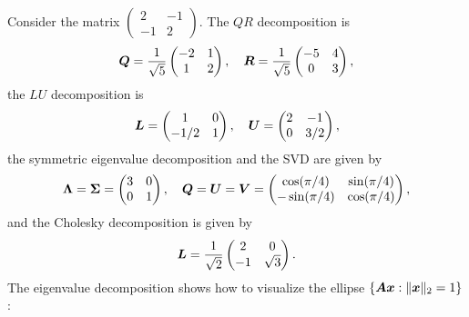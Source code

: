 \begin{example}
Consider the matrix $
  \begin{pmatrix}
    2 & -1\\ -1 & 2
  \end{pmatrix}$.
The $QR$ decomposition is
\begin{equation*}
\bm{Q} = \frac{1}{\sqrt{5}}\begin{pmatrix}
-2 & 1\\
1 & 2
\end{pmatrix}, \quad
\bm{R} = \frac{1}{\sqrt{5}}\begin{pmatrix}
-5 & 4\\
0 & 3
\end{pmatrix},
\end{equation*}
the $LU$ decomposition is
\begin{equation*}
\bm{L} = \begin{pmatrix}
1 & 0\\
-1/2 & 1
\end{pmatrix}, \quad
\bm{U} = \begin{pmatrix}
  2 & -1\\
  0 & 3/2
\end{pmatrix},
\end{equation*}
the symmetric eigenvalue decomposition and the SVD are given by
\begin{equation*}
 \bm{\Lambda} = \bm{\Sigma} = \begin{pmatrix}
 3 & 0\\
 0 & 1
 \end{pmatrix}, \quad
 \bm{Q} = \bm{U} = \bm{V} = \begin{pmatrix}
 \cos(\pi/4) & \sin(\pi/4)\\
 -\sin(\pi/4) & \cos(\pi/4)
 \end{pmatrix},
\end{equation*}
and the Cholesky decomposition is given by
\begin{equation*}
\bm{L} = \frac{1}{\sqrt{2}}\begin{pmatrix}
2 & 0\\
-1 & \sqrt{3}
\end{pmatrix}.
\end{equation*}
The eigenvalue decomposition shows how to visualize the ellipse $\{\bm{A}\bm{x} \mathrel{\mathop{:}} \Vert {\bm{x}}\Vert_2=1\}$: 
\begin{figure}[ht!]
\centering
{}
\end{figure}
\end{example}
